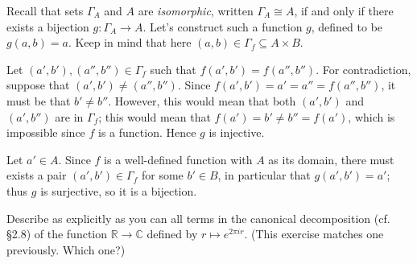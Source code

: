 \documentclass[12pt,letterpaper,boxed]{hmcpset}
\begin{document}
\begin{solution}
	Recall that sets $\Gamma_A$ and $A$ are \textit{isomorphic}, written
	$\Gamma_A\cong A$, if and only if there exists a bijection $g:\Gamma_A\to A$.
	Let's construct such a function $g$, defined to be $g(a,b) = a$. Keep in mind
	that here $(a,b)\in\Gamma_f\subseteq A\times B$.
	
	Let $(a',b'),(a'',b'')\in\Gamma_f$ such that $f(a',b') = f(a'',b'')$. For
	contradiction, suppose that $(a',b')\neq (a'',b'')$. Since $f(a',b') = a' = a''
	= f(a'',b'')$, it must be that $b'\neq b''$. However, this would mean that both
	$(a',b')$ and $(a',b'')$ are in $\Gamma_f$; this would mean that $f(a') = b'
	\neq b'' = f(a')$, which is impossible since $f$ is a function. Hence $g$ is
	injective.
	
	Let $a'\in A$. Since $f$ is a well-defined function with $A$ as its domain,
	there must exists a pair $(a',b')\in\Gamma_f$ for some $b'\in B$, in particular
	that $g(a',b') = a'$; thus $g$ is surjective, so it is a bijection.
\end{solution}


\begin{problem}[2.8]
	Describe as explicitly as you can all terms in the canonical decomposition (cf.
	\S2.8) of the function $\mathbb{R}\to\mathbb{C}$ defined by $r\mapsto e^{2\pi
		ir}$. (This exercise matches one previously. Which one?)
\end{problem}
\end{document}
